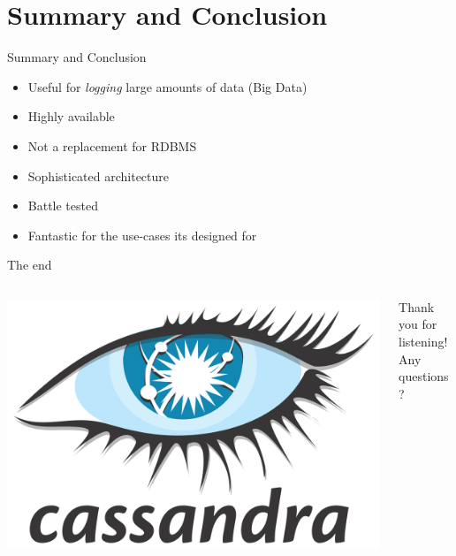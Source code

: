 \documentclass[
  10pt
]{beamer}
\begin{document}
\section{Summary and Conclusion}

\begin{frame}{Summary and Conclusion}
  \begin{itemize}
    \item<+-> Useful for \textit{logging} large amounts of data (Big Data)
    \item<+-> Highly available
    \item<+-> Not a replacement for RDBMS
    \item<+-> Sophisticated architecture
    \item<+-> Battle tested
    \item<+-> Fantastic for the use-cases its designed for
  \end{itemize}
\end{frame}

\begin{frame}{The end}
  \begin{columns}
    \begin{column}{0.5\textwidth}
      \includegraphics[width=\columnwidth]{resources/cassandra_logo.png}
    \end{column}
    \begin{column}{0.5\textwidth}
      Thank you for listening! \\
      Any questions?
    \end{column}
  \end{columns}
\end{frame}
\end{document}
